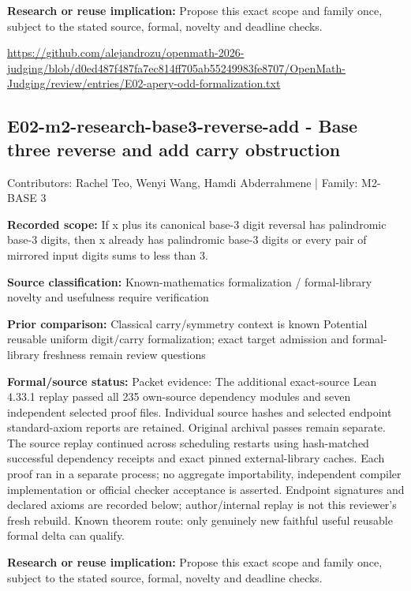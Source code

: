 \documentclass[11pt,a4paper]{article}
\begin{document}
\textbf{Research or reuse implication:} Propose this exact scope and family once, subject to the stated source, formal, novelty and deadline checks.

{\small \url{https://github.com/alejandrozu/openmath-2026-judging/blob/d0ed487f487fa7ec814ff705ab55249983fe8707/OpenMath-Judging/review/entries/E02-apery-odd-formalization.txt}\par}

\begin{samepage}
\subsection{E02-m2-research-base3-reverse-add  -  Base three reverse and add carry obstruction}
{\small Contributors: Rachel Teo, Wenyi Wang, Hamdi Abderrahmene | Family: M2-BASE 3\par}

\textbf{Recorded scope:} If x plus its canonical base-3 digit reversal has palindromic base-3 digits, then x already has palindromic base-3 digits or every pair of mirrored input digits sums to less than 3.

\end{samepage}
\textbf{Source classification:} Known-mathematics formalization / formal-library novelty and usefulness require verification

\textbf{Prior comparison:} Classical carry/symmetry context is known Potential reusable uniform digit/carry formalization; exact target admission and formal-library freshness remain review questions

\textbf{Formal/source status:} Packet evidence: The additional exact-source Lean 4.33.1 replay passed all 235 own-source dependency modules and seven independent selected proof files. Individual source hashes and selected endpoint standard-axiom reports are retained. Original archival passes remain separate. The source replay continued across scheduling restarts using hash-matched successful dependency receipts and exact pinned external-library caches. Each proof ran in a separate process; no aggregate importability, independent compiler implementation or official checker acceptance is asserted. Endpoint signatures and declared axioms are recorded below; author/internal replay is not this reviewer's fresh rebuild. Known theorem route: only genuinely new faithful useful reusable formal delta can qualify.

\textbf{Research or reuse implication:} Propose this exact scope and family once, subject to the stated source, formal, novelty and deadline checks.
\end{document}
